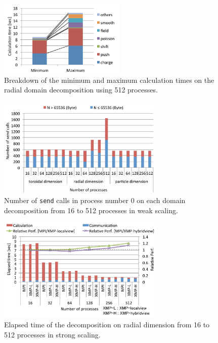 \begin{figure}[t]
\begin{center}
\includegraphics[width=6cm, bb=0 0 360 216]{./figure/loadimbalance.pdf}
\caption{Breakdown of the minimum and maximum calculation times on the radial domain decomposition using 512 processes.}
\label{load}
\end{center}
\end{figure}


\begin{figure}[t]
\begin{center}
\includegraphics[width=8cm, bb=0 0 492 294]{./figure/comm_w.pdf}
\caption{Number of {\tt send} calls in process number 0 on each domain decomposition from 16 to 512 processes in weak scaling. }
\label{comm_w}
\end{center}
\end{figure}







\begin{figure}[t]
\begin{center}
\includegraphics[width=8cm, bb=0 0 492 306]{./figure/radial_s.pdf}
\caption{Elapsed time of the decomposition on radial dimension from 16 to 512 processes in strong scaling.}
\label{radial_s}
\end{center}
\end{figure}


